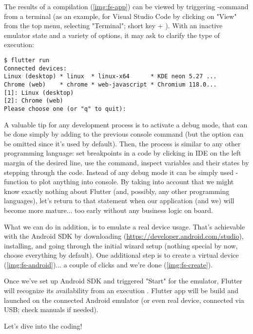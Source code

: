 \noindent The results of a compilation (\cref{img:fs-app}) can be viewed by triggering -command from a 
terminal (as an example, for Visual Studio Code by clicking on "View" from the top menu, selecting "Terminal"; short 
key  + ). With an inactive emulator state and a variety of options, it may ask to clarify 
the type of execution:

\begin{lstlisting}[language=terminal]
$ flutter run
Connected devices:
Linux (desktop) * linux  * linux-x64      * KDE neon 5.27 ...
Chrome (web)    * chrome * web-javascript * Chromium 118.0...
[1]: Linux (desktop)
[2]: Chrome (web)
Please choose one (or "q" to quit): 
\end{lstlisting}


\noindent A valuable tip for any development process is to activate a debug mode, that can be done simply by adding 
 to the previous console command (but the option can be omitted since it's used by default). Then, 
the process is similar to any other programming language: set breakpoints in a code by clicking in IDE on the left 
margin of the desired line, use the command, inspect variables and their states by stepping through the code. Instead 
of any debug mode it can be simply used -function to plot anything into console. By taking into account that 
we might know exactly nothing about Flutter (and, possibly, any other programming languages), let's return to that 
statement when our application (and we) will become more mature... too early without any business logic on board.

What we can do in addition, is to emulate a real device usage. That's achievable with the Android SDK by downloading 
(\href{https://developer.android.com/studio}{https://developer.android.com/studio}), installing, and going through 
the initial wizard setup (nothing special by now, choose everything by default). One additional step is to create a 
virtual device (\cref{img:fs-android})... a couple of clicks and we're done (\cref{img:fs-create}).

Once we've set up Android SDK and triggered "Start" for the emulator, Flutter will recognize its availability from
an execution . Flutter app will be build and launched on the connected Android emulator (or even real 
device, connected via USB; check manuals if needed).\\


\noindent Let's dive into the coding!
